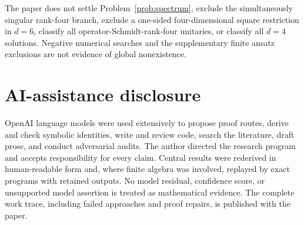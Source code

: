\documentclass[11pt]{article}
\theoremstyle{definition}
\theoremstyle{remark}
\begin{document}
The paper does not settle Problem~\ref{prob:spectrum}, exclude the
simultaneously singular rank-four branch, exclude a one-sided
four-dimensional square restriction in \(d=6\), classify all
operator-Schmidt-rank-four unitaries, or classify all \(d=4\) solutions.
Negative numerical searches and the supplementary finite ansatz
exclusions are not evidence of global nonexistence.

\section*{AI-assistance disclosure}

OpenAI language models were used extensively to propose proof routes,
derive and check symbolic identities, write and review code, search the
literature, draft prose, and conduct adversarial audits. The author directed
the research program and accepts responsibility for every claim. Central
results were rederived in human-readable form and, where finite algebra was
involved, replayed by exact programs with retained outputs. No model
residual, confidence score, or unsupported model assertion is treated as
mathematical evidence. The complete work trace, including failed
approaches and proof repairs, is published with the paper.
\end{document}
